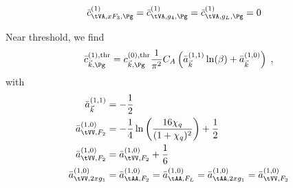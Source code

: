 
\begin{align}
\bar c_{\tVA,xF_3,\Pg}^{(1)} &= \bar c_{\tVA,g_4,\Pg}^{(1)} = \bar c_{\tVA,g_L,\Pg}^{(1)} = 0
\end{align}

Near threshold, we find
\begin{equation}
\bar c_{\vec k,\Pg}^{(1),\text{thr}} = c_{\vec k,\Pg}^{(0),\text{thr}} \frac{1}{\pi^2}
     C_A\left(\bar a_{\vec k}^{(1,1)}\ln(\beta) + \bar a_{\vec k}^{(1,0)}\right)\;,
\end{equation} 
with
\begin{align}
\bar a^{(1,1)}_{\vec k} &= -\frac 1 2\\
\bar a^{(1,0)}_{\tVV,F_2} &= -\frac 1 4 \ln\left(\frac{16\chi_q}{(1+\chi_q)^2}\right)+\frac 1 2\\
\bar a^{(1,0)}_{\tVV,F_2} &= \bar a^{(1,0)}_{\tVV,F_2} + \frac 1 6\\
\bar a^{(1,0)}_{\tVV,2xg_1} &= \bar a^{(1,0)}_{\tAA,F_2} = \bar a^{(1,0)}_{\tAA,F_L} = \bar a^{(1,0)}_{\tAA,2xg_1}= \bar a^{(1,0)}_{\tVV,F_2}
\end{align}

\clearpage
\pagebreak
